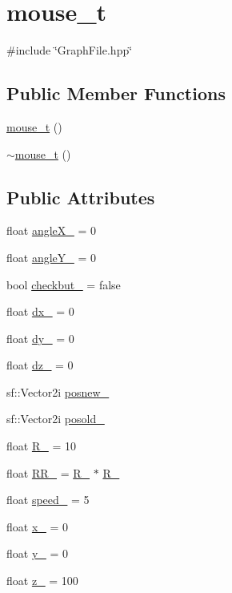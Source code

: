 \hypertarget{classmouse__t}{}\section{mouse\+\_\+t}
\label{classmouse__t}


{\ttfamily \#include \char`\"{}Graph\+File.\+hpp\char`\"{}}

\subsection*{Public Member Functions}
\begin{DoxyCompactItemize}
\item 
\hyperlink{classmouse__t_a0117a5a34b22dea1ff9b9eb2872ed107}{mouse\+\_\+t} ()
\item 
\hyperlink{classmouse__t_abe009b8c5b82914804113d5a85ee641a}{$\sim$mouse\+\_\+t} ()
\end{DoxyCompactItemize}
\subsection*{Public Attributes}
\begin{DoxyCompactItemize}
\item 
float \hyperlink{classmouse__t_a3bb043fbb3ebcffd8768ecd70adda576}{angle\+X\+\_\+} = 0
\item 
float \hyperlink{classmouse__t_aca49d667f44432535d37f5ee683fc690}{angle\+Y\+\_\+} = 0
\item 
bool \hyperlink{classmouse__t_a456b0dc2525354ab40c070179583cd4a}{checkbut\+\_\+} = false
\item 
float \hyperlink{classmouse__t_ab4c5208e4a5c5683decea04c15d018c6}{dx\+\_\+} = 0
\item 
float \hyperlink{classmouse__t_a736990a18878651b2214f1c780d4e66a}{dy\+\_\+} = 0
\item 
float \hyperlink{classmouse__t_a5728af521e32a9123640d03abe2ea001}{dz\+\_\+} = 0
\item 
sf\+::\+Vector2i \hyperlink{classmouse__t_a36e5d135625eb578cad8ebb7cb6a1294}{posnew\+\_\+}
\item 
sf\+::\+Vector2i \hyperlink{classmouse__t_a2db1a7bf88213de4b022aa1260e9f71e}{posold\+\_\+}
\item 
float \hyperlink{classmouse__t_a8c4c59a5c03edf37b4e8663bf1ac8864}{R\+\_\+} = 10
\item 
float \hyperlink{classmouse__t_acf93a98758b45159dbd34c6a2c71d122}{R\+R\+\_\+} = \hyperlink{classmouse__t_a8c4c59a5c03edf37b4e8663bf1ac8864}{R\+\_\+} $\ast$ \hyperlink{classmouse__t_a8c4c59a5c03edf37b4e8663bf1ac8864}{R\+\_\+}
\item 
float \hyperlink{classmouse__t_a6bcf637aa4f03937954c7e26c6123c7c}{speed\+\_\+} = 5
\item 
float \hyperlink{classmouse__t_a902ac86b499a19c0cd4405d18bf03551}{x\+\_\+} = 0
\item 
float \hyperlink{classmouse__t_ac026f8fee6095db0f1867db5c250b83f}{y\+\_\+} = 0
\item 
float \hyperlink{classmouse__t_a42626aabbe4860f2e6bb5e0e840c8e1d}{z\+\_\+} = 100
\end{DoxyCompactItemize}


